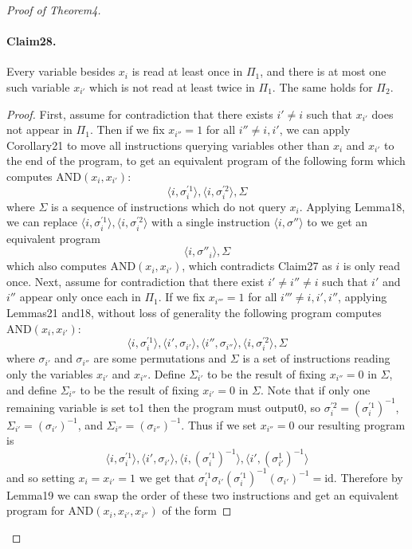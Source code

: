 \documentclass[10pt,a4paper]{article}
\begin{document}
\begin{proof}[Proof of Theorem4]
\paragraph{Claim28.} Every variable besides $x_i$ is read at least once in $\Pi_1$, and there is at most one such variable $x_{i'}$ which is not read at least twice in $\Pi_1$. The same holds for $\Pi_2$.
\begin{proof}
First, assume for contradiction that there exists $i'\neq i$ such that $x_{i'}$ does not appear in $\Pi_1$. Then if we fix $x_{i''}=1$ for all $i''\neq i,i'$, we can apply Corollary21 to move all instructions querying variables other than $x_i$ and $x_{i'}$ to the end of the program, to get an equivalent program of the following form which computes $\mathrm{AND}(x_i,x_{i'})$:
\[\langle i,\sigma_i^{\prime1}\rangle,\langle i,\sigma_i^{\prime2}\rangle,\Sigma\]
where $\Sigma$ is a sequence of instructions which do not query $x_i$. Applying Lemma18, we can replace $\langle i,\sigma_i^{\prime1}\rangle,\langle i,\sigma_i^{\prime2}\rangle$ with a single instruction $\langle i,\sigma''\rangle$ to we get an equivalent program
\[\langle i,\sigma''_i\rangle,\Sigma\]
which also computes $\mathrm{AND}(x_i,x_{i'})$, which contradicts Claim27 as $i$ is only read once.
Next, assume for contradiction that there exist $i'\neq i''\neq i$ such that $i'$ and $i''$ appear only once each in $\Pi_1$. If we fix $x_{i'''}=1$ for all $i'''\neq i,i',i''$, applying Lemmas21 and18, without loss of generality the following program computes $\mathrm{AND}(x_i,x_{i'})$:
\[\langle i,\sigma_i^{\prime1}\rangle,\langle i',\sigma_{i'}\rangle,\langle i'',\sigma_{i''}\rangle,\langle i,\sigma_i^{\prime2}\rangle,\Sigma\]
where $\sigma_{i'}$ and $\sigma_{i''}$ are some permutations and $\Sigma$ is a set of instructions reading only the variables $x_{i'}$ and $x_{i''}$.
Define $\Sigma_{i'}$ to be the result of fixing $x_{i''}=0$ in $\Sigma$, and define $\Sigma_{i''}$ to be the result of fixing $x_{i'}=0$ in $\Sigma$. Note that if only one remaining variable is set to1 then the program must output0, so $\sigma_i^{\prime2}=(\sigma_i^{\prime1})^{-1}$, $\Sigma_{i'}=(\sigma_{i'})^{-1}$, and $\Sigma_{i''}=(\sigma_{i''})^{-1}$. Thus if we set $x_{i''}=0$ our resulting program is
\[\langle i,\sigma_i^{\prime1}\rangle,\langle i',\sigma_{i'}\rangle,\langle i,(\sigma_i^{\prime1})^{-1}\rangle,\langle i',(\sigma_{i'}^1)^{-1}\rangle\]
and so setting $x_i=x_{i'}=1$ we get that $\sigma_i^{\prime1}\sigma_{i'}(\sigma_i^{\prime1})^{-1}(\sigma_{i'})^{-1}=\mathrm{id}$. Therefore by Lemma19 we can swap the order of these two instructions and get an equivalent program for $\mathrm{AND}(x_i,x_{i'},x_{i''})$ of the form

\end{proof}
\end{proof}
\end{document}

